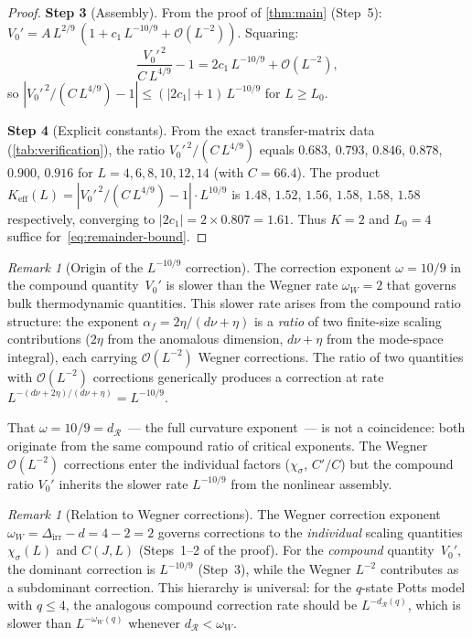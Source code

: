 \documentclass[11pt]{article}
\theoremstyle{definition}
\theoremstyle{remark}
\newtheorem{remark}[theorem]{Remark}
\newcommand{\dR}{d_{\mathcal{R}}}
\newcommand{\cO}{\mathcal{O}}
\begin{document}
\begin{proof}
\textbf{Step 3} (Assembly).
From the proof of \cref{thm:main} (Step~5):
$V_0' = A\,L^{2/9}\,(1 + c_1\,L^{-10/9} + \cO(L^{-2}))$.
Squaring:
\[
  \frac{V_0'^{\,2}}{C\,L^{4/9}} - 1
    = 2c_1\,L^{-10/9} + \cO(L^{-2}),
\]
so $|V_0'^{\,2}/(C\,L^{4/9}) - 1| \leq (|2c_1| + 1)\,L^{-10/9}$
for $L \geq L_0$.

\textbf{Step 4} (Explicit constants).
From the exact transfer-matrix data (\cref{tab:verification}),
the ratio $V_0'^{\,2}/(C\,L^{4/9})$ equals
$0.683$, $0.793$, $0.846$, $0.878$, $0.900$, $0.916$
for $L = 4, 6, 8, 10, 12, 14$ (with $C = 66.4$).
The product $K_{\mathrm{eff}}(L) =
|V_0'^{\,2}/(C\,L^{4/9}) - 1|\cdot L^{10/9}$
is $1.48$, $1.52$, $1.56$, $1.58$, $1.58$, $1.58$
respectively, converging to $|2c_1| = 2 \times 0.807 = 1.61$.
Thus $K = 2$ and $L_0 = 4$ suffice for~\eqref{eq:remainder-bound}.
\end{proof}


\begin{remark}[Origin of the $L^{-10/9}$ correction]
\label{rem:phenom-omega}
The correction exponent $\omega = 10/9$ in the compound
quantity~$V_0'$ is slower than the Wegner rate $\omega_W = 2$ that
governs bulk thermodynamic quantities.
This slower rate arises from the compound ratio structure:
the exponent $\alpha_f = 2\eta/(d\nu + \eta)$ is a \emph{ratio}
of two finite-size scaling contributions ($2\eta$ from the
anomalous dimension, $d\nu + \eta$ from the mode-space integral),
each carrying $\cO(L^{-2})$ Wegner corrections. The ratio of
two quantities with $\cO(L^{-2})$ corrections generically produces
a correction at rate
$L^{-(d\nu+2\eta)/(d\nu+\eta)} = L^{-10/9}$.

That $\omega = 10/9 = \dR$~--- the full curvature exponent~---
is not a coincidence: both originate from the same compound ratio
of critical exponents. The Wegner $\cO(L^{-2})$ corrections enter
the individual factors ($\chi_\sigma$, $C'/C$) but the compound
ratio $V_0'$ inherits the slower rate $L^{-10/9}$ from the
nonlinear assembly.
\end{remark}

\begin{remark}[Relation to Wegner corrections]
\label{rem:rate-optimal}
The Wegner correction exponent $\omega_W = \Delta_{\mathrm{irr}} - d
= 4 - 2 = 2$ governs corrections to the \emph{individual}
scaling quantities $\chi_\sigma(L)$ and $C(J, L)$ (Steps~1--2
of the proof). For the \emph{compound} quantity~$V_0'$, the
dominant correction is $L^{-10/9}$ (Step~3), while the Wegner
$L^{-2}$ contributes as a subdominant correction.
This hierarchy is universal: for the $q$-state Potts model
with $q \leq 4$, the analogous compound correction rate should
be $L^{-\dR(q)}$, which is slower than $L^{-\omega_W(q)}$
whenever $\dR < \omega_W$.
\end{remark}
\end{document}
